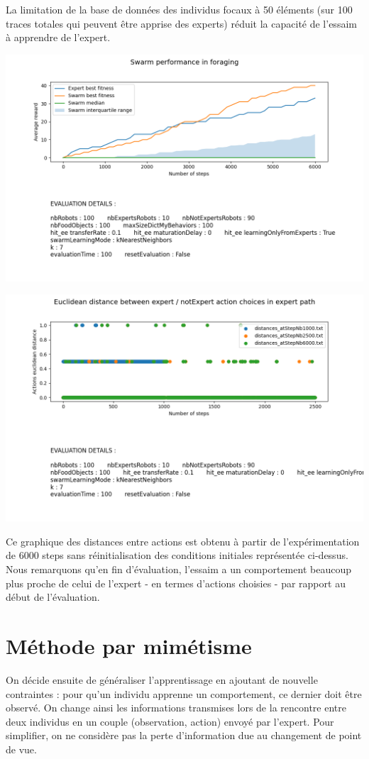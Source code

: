 \documentclass[a4paper, 12pt]{report}
\begin{document}
    La limitation de la base de données des individus focaux à 50 éléments (sur 100 traces totales qui peuvent être apprise des experts) réduit la capacité de l'essaim à apprendre de l'expert. 
    
    
    \includegraphics[scale=0.5]{knn6000_100_noReset.png}
        
    \includegraphics[scale=0.5]{distances_knn.png}
    
    Ce graphique des distances entre actions est obtenu à partir de l'expérimentation de 6000 steps sans réinitialisation des conditions initiales représentée ci-dessus. Nous remarquons qu'en fin d'évaluation, l'essaim a un comportement beaucoup plus proche de celui de l'expert - en termes d'actions choisies - par rapport au début de l'évaluation.
    
    
    
    
    
	\section{Méthode par mimétisme}
	On décide ensuite de généraliser l'apprentissage en ajoutant de nouvelle contraintes : pour qu'un individu apprenne un comportement, ce dernier doit être observé. On change ainsi les informations transmises lors de la rencontre entre deux individus en un couple (observation, action) envoyé par l'expert.
	Pour simplifier, on ne considère pas la perte d'information due au changement de point de vue.
\end{document}
